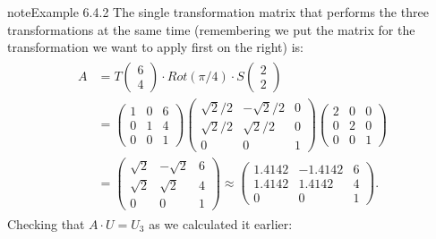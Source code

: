 \documentclass[letterpaper,10pt,english]{jupyterBook}
\begin{document}
\begin{sphinxadmonition}{note}{Example 6.4.2}
\sphinxAtStartPar
The single transformation matrix that performs the three transformations at the same time (remembering we put the matrix for the transformation we want to apply first on the right) is:
\begin{equation*}
\begin{split} \begin{align*}
    A &= T\begin{pmatrix} 6 \\ 4 \end{pmatrix} \cdot Rot(\pi/4) \cdot S\begin{pmatrix} 2 \\ 2 \end{pmatrix} \\
    &= \begin{pmatrix}
        1 & 0 & 6 \\
        0 & 1 & 4 \\
        0 & 0 & 1
    \end{pmatrix}
    \begin{pmatrix}
        \sqrt{2}/2 & -\sqrt{2}/2 & 0 \\
        \sqrt{2}/2 & \sqrt{2}/2 & 0 \\
        0 & 0 & 1
    \end{pmatrix}
    \begin{pmatrix}
        2 & 0 & 0 \\
        0 & 2 & 0 \\
        0 & 0 & 1
    \end{pmatrix} \\
    &= \begin{pmatrix}
        \sqrt{2} & - \sqrt{2} & 6 \\
        \sqrt{2} & \sqrt{2} & 4 \\
        0 & 0 & 1
    \end{pmatrix}
    \approx
    \begin{pmatrix}
        1.4142 & -1.4142 & 6 \\
        1.4142 & 1.4142 & 4 \\
        0 & 0 & 1
    \end{pmatrix}.
\end{align*} \end{split}
\end{equation*}
\sphinxAtStartPar
Checking that \(A \cdot U = U_3\) as we calculated it earlier:
\begin{equation*}
\begin{split} \begin{align*}

\end{align*}
\end{split}
\end{equation*}
\end{sphinxadmonition}
\end{document}

